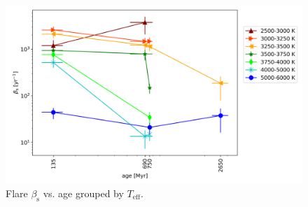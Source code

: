 \documentclass{aa}
\begin{document}
\begin{figure}
    \centering
    \includegraphics[width=13.5cm]{pics/FFDs/beta_T_age_ED_wheatland.png}
    \caption{Flare $\beta_\mathrm{s}$ vs. age grouped by $T_\mathrm{eff}$.}          	
    \label{powerlawfits_s}
\end{figure}


\end{document}
